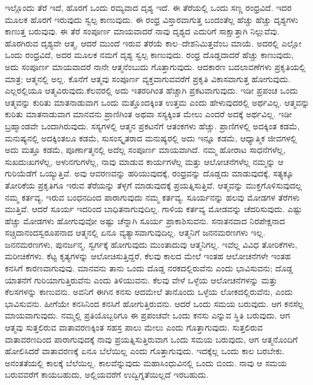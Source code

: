 ಇಲ್ಲೊಂದು ತೆರೆ ಇದೆ, ಹೊರಗೆ ಒಂದು ರಮ್ಯವಾದ ದೃಶ್ಯ ಇದೆ. ಈ ತೆರೆಯಲ್ಲಿ ಒಂದು ಸಣ್ಣ ರಂಧ್ರವಿದೆ. ಇದರ ಮೂಲಕ ಹೊರಗೆ ಇರುವುದು ಸ್ವಲ್ಪ ಕಾಣುವುದು. ಈ ರಂಧ್ರ ವಿಸ್ತಾರವಾಗುತ್ತ ಬಂದಂತೆಲ್ಲ ಹೆಚ್ಚು ಹೆಚ್ಚು ದೃಶ್ಯಗಳು ಕಾಣುತ್ತ ಬರುವುವು. ಈ ತೆರೆ ಸಂಪೂರ್ಣ ಮಾಯವಾದರೆ ನಾವು ದೃಶ್ಯದ ಎದುರಿಗೆ ಸಾಕ್ಷಾತ್ತಾಗಿ ನಿಲ್ಲುವೆವು. ಹೊರಗಿರುವ ದೃಶ್ಯವೇ ಆತ್ಮ, ಆದರೆ ಮುಂದೆ ಇರುವ ತೆರೆಯೆ ಕಾಲ–ದೇಶನಿಮಿತ್ತವೆಂಬ ಮಾಯೆ. ಅದರಲ್ಲಿ ಎಲ್ಲೋ ಒಂದು ರಂಧ್ರವಿದೆ, ಅದರ ಮೂಲಕ ನಮಗೆ ದೃಶ್ಯ ಸ್ವಲ್ಪ ಕಾಣುವುದು. ರಂಧ್ರ ದೊಡ್ಡದಾದರೆ ಹೆಚ್ಚು ಕಾಣುವುದು, ಅದು ಸಂಪೂರ್ಣ ಮಾಯವಾದರೆ ನಾನೇ ಆತ್ಮನೆಂಬುದು ಗೊತ್ತಾಗುವುದು. ಆದಕಾರಣ ಬದಲಾವಣೆಗಳು ಪ್ರಕೃತಿಯಲ್ಲಿ ಮಾತ್ರ; ಆತ್ಮನಲ್ಲಿ ಅಲ್ಲ. ಕೊನೆಗೆ ಆತ್ಮವು ಸಂಪೂರ್ಣ ವ್ಯಕ್ತವಾಗುವವರೆಗೆ ಪ್ರಕೃತಿ ವಿಕಾಸವಾಗುತ್ತ ಹೋಗುವುದು. ಎಲ್ಲರಲ್ಲಿಯೂ ಆತ್ಮವಿರುವುದು.\break ಕೆಲವರಲ್ಲಿ ಅದು ಇತರರಿಗಿಂತ ಹೆಚ್ಚಾಗಿ ಪ್ರಕಟವಾಗುವುದು. ಇಡೀ ಪ್ರಪಂಚ ಒಂದು ಆತ್ಮವನ್ನು ಕುರಿತು ಮಾತನಾಡುವಾಗ ಒಂದು ಮತ್ತೊಂದಕ್ಕಿಂತ ಉತ್ತಮ ಎಂದು ಹೇಳುವುದರಲ್ಲಿ ಅರ್ಥವಿಲ್ಲ. ಆತ್ಮವನ್ನು ಕುರಿತು ಮಾತನಾಡುವಾಗ ಮಾನವನು ಪ್ರಾಣಿಗಿಂತ ಅಥವಾ ಸಸ್ಯಕ್ಕಿಂತ ಮೇಲು ಎಂದರೆ ಅದಕ್ಕೆ ಅರ್ಥವಿಲ್ಲ. ಇಡೀ ಬ್ರಹ್ಮಾಂಡವೇ ಒಂದಾಗಿರುವುದು. ಸಸ್ಯಗಳಲ್ಲಿ ಆತ್ಮನ ಪ್ರಕಟನೆಗೆ ಆತಂಕಗಳು ಹೆಚ್ಚು. ಪ್ರಾಣಿಗಳಲ್ಲಿ ಅದಕ್ಕಿಂತ ಕಡಮೆ, ಮನುಷ್ಯನಲ್ಲಿ ಅದಕ್ಕಿಂತಲೂ ಕಡಮೆ, ಸುಸಂಸ್ಕೃತರಾದ ಮನುಷ್ಯರಲ್ಲಿ ಅದು ಇನ್ನೂ ಕಡಮೆ, ಆಧ್ಯಾತ್ಮಿಕ ಜೀವಗಳಲ್ಲಿ ಅದು ಮತ್ತೂ ಕಡಮೆ, ಪೂರ್ಣಾತ್ಮನಲ್ಲಿ ಅದೆಲ್ಲ ಸಂಪೂರ್ಣ ಮಾಯವಾಗಿದೆ. ನಮ್ಮ ಹೋರಾಟ ಸಾಧನೆಗಳೆಲ್ಲ, ಸುಖದುಃಖಗಳೆಲ್ಲ, ಅಳುನಗುಗಳೆಲ್ಲ, ನಾವು ಮಾಡುವ ಕಾರ್ಯಗಳೆಲ್ಲ ಮತ್ತು ಆಲೋಚನೆಗಳೆಲ್ಲ ನಮ್ಮನ್ನು ಆ ಗುರಿಯೆಡೆಗೆ ಒಯ್ಯುತ್ತಿವೆ. ಅವು ಆವರಣವನ್ನು ಹರಿಯುವುದಕ್ಕೆ, ರಂಧ್ರವನ್ನು ದೊಡ್ಡದು ಮಾಡುವುದಕ್ಕೆ, ಸತ್ಯಕ್ಕೂ ತೋರಿಕೆಯ ಪ್ರಕೃತಿಗೂ ಇರುವ ತೆರೆಯನ್ನು ತೆಳ್ಳಗೆ ಮಾಡುವುದಕ್ಕೆ ಪ್ರಯತ್ನಿಸುತ್ತಿವೆ. ಆತ್ಮವನ್ನು ಮುಕ್ತಗೊಳಿಸುವುದಲ್ಲ ನಮ್ಮ ಕರ್ತವ್ಯ, ಇರುವ ಬಂಧನದಿಂದ ಪಾರಾಗುವುದು ನಮ್ಮ ಕರ್ತವ್ಯ. ಸೂರ್ಯನನ್ನು ಹಲವು ಮೋಡಗಳ ತೆರೆಗಳು ಮುತ್ತಿವೆ. ಆದರೆ ಸೂರ್ಯ ಇದರಿಂದ ಬಾಧಿತನಾಗುವುದಿಲ್ಲ. ಗಾಳಿಯ ಕರ್ತವ್ಯ ಮೋಡವನ್ನು ಚೆದರಿಸುವುದು. ಎಷ್ಟು ಹೆಚ್ಚು ಮೋಡಗಳು ಹೋಗುವುವೋ ಅಷ್ಟು ಚೆನ್ನಾಗಿ ಸೂರ್ಯ ಪ್ರಾಕಾಶಿಸುವನು. ಸನಾತನವಾದ ನಿರಪೇಕ್ಷನಾದ ಸಚ್ಚಿದಾನಂದಸ್ವರೂಪನಾದ ಆತ್ಮನಲ್ಲಿ ಏನೂ ವ್ಯತ್ಯಾಸವಾಗುವುದಿಲ್ಲ. ಆತ್ಮನಿಗೆ ಜನನಮರಣಗಳು ಇಲ್ಲ. ಜನನಮರಣಗಳು, ಪುನರ್ಜನ್ಮ, ಸ್ವರ್ಗಕ್ಕೆ ಹೋಗುವುದು ಮುಂತಾದುವು ಆತ್ಮನಿಗಲ್ಲ. ಇವೆಲ್ಲ ವಿವಿಧ ತೋರಿಕೆಗಳು, ಮರೀಚಿಕೆಗಳು. ಕೆಟ್ಟ ಕೃತ್ಯಗಳನ್ನು ಆಲೋಚಿಸುತ್ತಿದ್ದರೆ, ಕೆಲವು ಕಾಲದ ಮೇಲೆ ಇಂತಹ ಆಲೋಚನೆಗಳೇ ಇಂತಹ ಕನಸಿಗೆ ಕಾರಣವಾಗುವುವು. ಮಾನವನು ತಾನು ಒಂದು ದೊಡ್ಡ ನರಕದಲ್ಲಿರುವೆನು ಎಂದು ಭಾವಿಸುವನು; ದೊಡ್ಡ ಯಾತನೆಗೆ ಗುರಿಯಾಗುತ್ತಿರುವೆನು ಎಂದು ತಿಳಿಯುವನು. ಕೆಲವು ವೇಳೆ ಒಳ್ಳೆಯ ಆಲೋಚನೆಗಳನ್ನು ಮತ್ತು ಕೆಲಸಗಳನ್ನು ಕಾಣುವನು. ಅವನಿಗೆ ಈಗಿನ ಕನಸು ಆದಮೇಲೆ ತಾನೊಂದು ಒಳ್ಳೆಯ ಲೋಕದಲ್ಲಿರುವೆನು, ಎಂದು ಭಾವಿಸುವನು. ಹೀಗೆಯೇ ಕನಸಿನಿಂದ ಕನಸಿಗೆ ಹೋಗುತ್ತಿರುವನು. ಆದರೆ ಒಂದು ಸಮಯ ಬರುವುದು. ಆಗ ಕನಸೆಲ್ಲ ಮಾಯವಾಗುವುದು. ನಮ್ಮಲ್ಲಿ ಪ್ರತಿಯೊಬ್ಬರಿಗೂ ಈ ಪ್ರಪಂಚವೇ ಒಂದು ಕನಸು ಎನ್ನುವ ಸ್ಥಿತಿ ಬರುವುದು. ಆಗ ಆತ್ಮವು ಸುತ್ತಲಿರುವ ವಾತಾವರಣಕ್ಕಿಂತ ಸಹಸ್ರ ಪಾಲು ಮೇಲು ಎಂದು ಗೊತ್ತಾಗುವುದು. ಸುತ್ತಲಿರುವ ವಾತಾವರಣದಿಂದ ಪಾರಾಗುವುದಕ್ಕೆ ನಾವು ಪ್ರಯತ್ನಿಸುತ್ತಿರುವಾಗ ಒಂದು ಸಮಯ ಬರುವುದು, ಆಗ ಆತ್ಮನೊಂದಿಗೆ ಹೋಲಿಸಿದರೆ ವಾತಾವರಣಕ್ಕೆ ಏನೂ ಬೆಲೆಯಿಲ್ಲ ಎಂದು ಗೊತ್ತಾಗುವುದು. ಇದಕ್ಕೆಲ್ಲ ಒಂದು ಕಾಲ ಬರಬೇಕು. ಅನಂತತೆಯಲ್ಲಿ ಕಾಲಕ್ಕೆ ಬೆಲೆಯಿಲ್ಲ. ಕಾಲವೆನ್ನುವುದು ಮಹಾಸಿಂಧುವಿನಲ್ಲಿ ಒಂದು ಬಿಂದು. ನಾವು ಆ ಸಮಯ ಬರುವವರೆಗೆ ಕಾಯಬಹುದು, ಅಲ್ಲಿಯವರೆಗೆ ಉದ್ವಿಗ್ನತೆಯಿಲ್ಲದೆ ಇರಬಹುದು.

